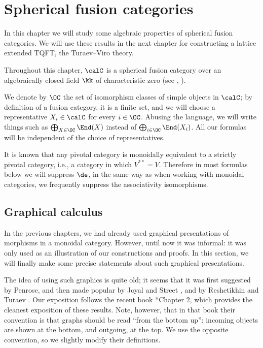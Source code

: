 \chapter{Spherical fusion categories}\label{c:spherical}

In this chapter we will study some algebraic properties of spherical fusion
categories. We will use these results in the next chapter for constructing
a lattice extended TQFT, the Turaev--Viro theory.

Throughout this chapter, $\calC$ is a spherical fusion category over an
algebraically closed field $\kk$ of characteristic zero (see ,
).

We denote by $\OC$ the set of isomorphism classes of simple objects in $\calC$;
by definition of a fusion category, it is a finite set, and we will choose a
representative $X_i\in \calC$ for every $i\in \OC$. Abusing the language, we
will write things such as $\bigoplus_{X\in \OC} \End(X)$ instead of
$\bigoplus_{i\in \OC}\End(X_i)$. All our formulas will be independent of the
choice of representatives.

It is known that any pivotal category is monoidally equivalent to a strictly
pivotal category, i.e., a category in which $V^{**}=V$. Therefore in most
formulas below we will suppress $\de$, in the same way as when working with
monoidal categories, we frequently suppress the associativity isomorphisms.



\section{Graphical calculus}\label{s:graphical}
In the previous chapters, we had already used graphical presentations
of morphisms in a monoidal category. However, until now it was informal:
it was only used as an illustration of our constructions and proofs.
In this section, we will finally make some precise statements about such
graphical presentations.

The idea of using such graphics is quite old; it seems that it was first
suggested by Penrose, and then made popular by Joyal and Street
,  and by Reshetikhin and Turaev
. Our exposition follows the recent book
*{Chapter 2}, which provides the cleanest exposition
of these results. Note, however, that in that book their convention is that
graphs should be read ``from the bottom up'': incoming objects are shown at the
bottom, and outgoing, at the top. We use the opposite convention, so we
slightly modify their definitions.

